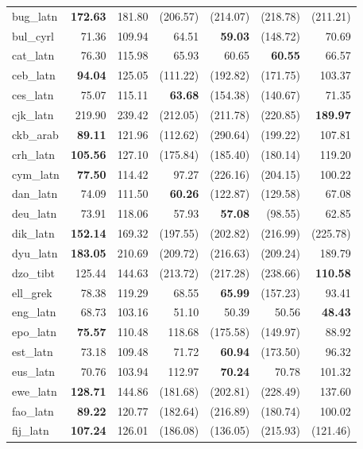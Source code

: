 \documentclass[11pt]{article}
\begin{document}
\begin{center}
\begin{longtable}[width=0.9\textwidth]{|l|rrrrrr|}
bug\_latn & \textbf{172.63} & 181.80 & (206.57) & (214.07) & (218.78) & (211.21) \\ 
bul\_cyrl & 71.36 & 109.94 & 64.51 & \textbf{59.03} & (148.72) & 70.69 \\ 
cat\_latn & 76.30 & 115.98 & 65.93 & 60.65 & \textbf{60.55} & 66.57 \\ 
ceb\_latn & \textbf{94.04} & 125.05 & (111.22) & (192.82) & (171.75) & 103.37 \\ 
ces\_latn & 75.07 & 115.11 & \textbf{63.68} & (154.38) & (140.67) & 71.35 \\ 
cjk\_latn & 219.90 & 239.42 & (212.05) & (211.78) & (220.85) & \textbf{189.97} \\ 
ckb\_arab & \textbf{89.11} & 121.96 & (112.62) & (290.64) & (199.22) & 107.81 \\ 
crh\_latn & \textbf{105.56} & 127.10 & (175.84) & (185.40) & (180.14) & 119.20 \\ 
cym\_latn & \textbf{77.50} & 114.42 & 97.27 & (226.16) & (204.15) & 100.22 \\ 
dan\_latn & 74.09 & 111.50 & \textbf{60.26} & (122.87) & (129.58) & 67.08 \\ 
deu\_latn & 73.91 & 118.06 & 57.93 & \textbf{57.08} & (98.55) & 62.85 \\ 
dik\_latn & \textbf{152.14} & 169.32 & (197.55) & (202.82) & (216.99) & (225.78) \\ 
dyu\_latn & \textbf{183.05} & 210.69 & (209.72) & (216.63) & (209.24) & 189.79 \\ 
dzo\_tibt & 125.44 & 144.63 & (213.72) & (217.28) & (238.66) & \textbf{110.58} \\ 
ell\_grek & 78.38 & 119.29 & 68.55 & \textbf{65.99} & (157.23) & 93.41 \\ 
eng\_latn & 68.73 & 103.16 & 51.10 & 50.39 & 50.56 & \textbf{48.43} \\ 
epo\_latn & \textbf{75.57} & 110.48 & 118.68 & (175.58) & (149.97) & 88.92 \\ 
est\_latn & 73.18 & 109.48 & 71.72 & \textbf{60.94} & (173.50) & 96.32 \\ 
eus\_latn & 70.76 & 103.94 & 112.97 & \textbf{70.24} & 70.78 & 101.32 \\ 
ewe\_latn & \textbf{128.71} & 144.86 & (181.68) & (202.81) & (228.49) & 137.60 \\ 
fao\_latn & \textbf{89.22} & 120.77 & (182.64) & (216.89) & (180.74) & 100.02 \\ 
fij\_latn & \textbf{107.24} & 126.01 & (186.08) & (136.05) & (215.93) & (121.46) \\ 

\end{longtable}
\end{center}
\end{document}
